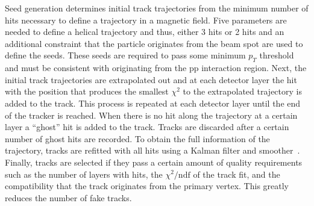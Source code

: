 Seed generation determines initial track trajectories from the minimum number of hits necessary to define a trajectory in a magnetic field. Five parameters are needed to define a helical trajectory and thus, either 3 hits or 2 hits and an additional constraint that the particle originates from the beam spot are used to define the seeds. These seeds are required to pass some minimum $p_{T}$ threshold and must be consistent with originating from the pp interaction region. Next, the initial track trajectories are extrapolated out and at each detector layer the hit with the position that produces the smallest $\chi^{2}$ to the extrapolated trajectory is added to the track. This process is repeated at each detector layer until the end of the tracker is reached. When there is no hit along the trajectory at a certain layer a ``ghost'' hit is added to the track. Tracks are discarded after a certain number of ghost hits are recorded. To obtain the full information of the trajectory, tracks are refitted with all hits using a Kalman filter and smoother~\cite{KalmanFilter}. Finally, tracks are selected if they pass a certain amount of quality requirements such as the number of layers with hits, the $\chi^{2}/\mathrm{ndf}$ of the track fit, and the compatibility that the track originates from the primary vertex. This greatly reduces the number of fake tracks. 



